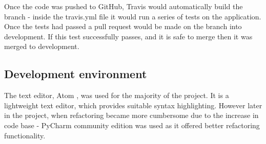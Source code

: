 Once the code was pushed to GitHub, Travis would automatically build the branch - inside the travis.yml file it would run a series of tests on the application. Once the tests had passed a pull request would be made on the branch into development. If this test successfully passes, and it is safe to merge then it was merged to development.

\subsection{Development environment}
The text editor, Atom \cite{citeulike:14023852}, was used for the majority of the project. It is a lightweight text editor, which provides suitable syntax highlighting. However later in the project, when refactoring became more cumbersome due to the increase in code base - PyCharm community edition \cite{citeulike:14023855} was used as it offered better refactoring functionality.
